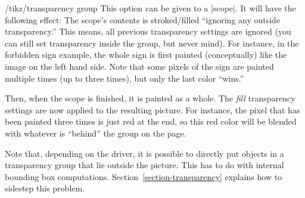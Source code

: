 \begin{key}{/tikz/transparency group}
  This option can be given to a |scope|. It will have the following
  effect: The scope's contents is stroked/filled
  ``ignoring any outside transparency.'' This means, all previous
  transparency settings are ignored (you can still set transparency
  inside the group, but never mind). For instance, in the forbidden
  sign example, the whole sign is first painted (conceptually) like
  the image on the left hand side. Note that some pixels of the sign
  are painted multiple times (up to three times), but only the last
  color ``wins.''

  Then, when the scope is finished, it is painted as a whole. The
  \emph{fill} transparency settings are now applied to the resulting
  picture. For instance, the pixel that has been painted three times
  is just red at the end, so this red color will be blended with
  whatever is ``behind'' the group on the page.

  Note that, depending on the driver, it is possible to directly put
  objects in a transparency group that lie outside the picture. This
  has to do with internal bounding box computations.
  Section~\ref{section-transparency} explains how to sidestep this
  problem.
\end{key}



